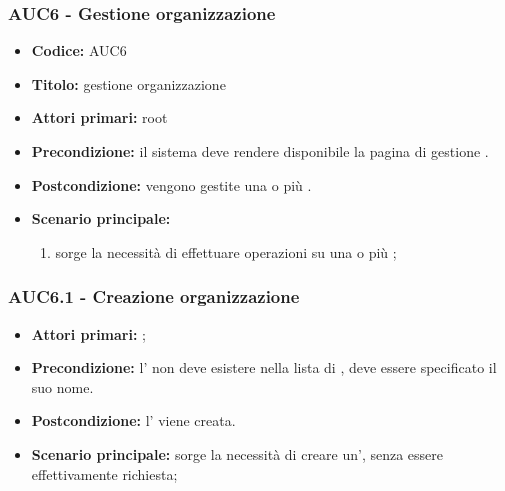 \documentclass[casi-duso]{subfiles}
\begin{document}
\subsubsection{AUC6 - Gestione organizzazione}%
\label{subsub:AUC6}
\begin{itemize}
  \item \textbf{Codice:} AUC6
  \item \textbf{Titolo:} gestione organizzazione
  \item \textbf{Attori primari:} root
  \item \textbf{Precondizione:} il sistema deve rendere disponibile la pagina di gestione .
  \item \textbf{Postcondizione:} vengono gestite una o più .
  \item \textbf{Scenario principale:}
  \begin{enumerate}
    \item sorge la necessità di effettuare operazioni su una o più ;
  \end{enumerate}
\end{itemize}


\subsubsection{AUC6.1 - Creazione organizzazione}%
\label{subsub:AUC6.1}
\begin{itemize}
  \item \textbf{Attori primari:} ;
  \item \textbf{Precondizione:} l' non deve esistere nella lista di , deve essere specificato il suo nome.
  \item \textbf{Postcondizione:} l' viene creata.
  \item \textbf{Scenario principale:} sorge la necessità di creare un', senza essere effettivamente richiesta;
\end{itemize}
\end{document}

